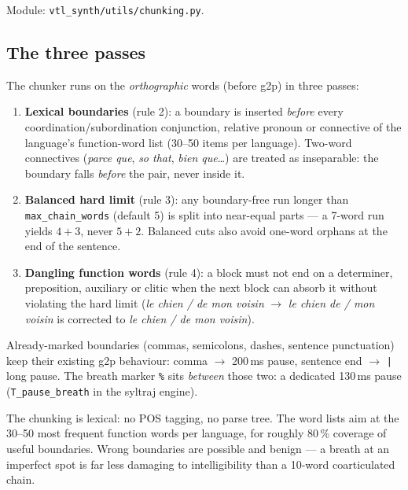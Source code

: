 \documentclass[11pt,a4paper]{article}
\newcommand{\ks}[1]{\texttt{#1}}
\begin{document}
Module: \texttt{vtl\_synth/utils/chunking.py}.

\subsection{The three passes}

The chunker runs on the \emph{orthographic} words (before g2p) in
three passes:

\begin{enumerate}[itemsep=2pt]
\item \textbf{Lexical boundaries} (rule 2): a boundary is inserted
  \emph{before} every coordination/subordination conjunction,
  relative pronoun or connective of the language's function-word
  list (30--50 items per language). Two-word connectives
  (\emph{parce que}, \emph{so that}, \emph{bien que}\ldots) are
  treated as inseparable: the boundary falls \emph{before} the
  pair, never inside it.
\item \textbf{Balanced hard limit} (rule 3): any boundary-free run
  longer than \texttt{max\_chain\_words} (default 5) is split into
  near-equal parts --- a 7-word run yields $4+3$, never $5+2$.
  Balanced cuts also avoid one-word orphans at the end of the
  sentence.
\item \textbf{Dangling function words} (rule 4): a block must not
  end on a determiner, preposition, auxiliary or clitic when the
  next block can absorb it without violating the hard limit
  (\emph{le chien / de mon voisin} $\rightarrow$ \emph{le chien de
  / mon voisin} is corrected to \emph{le chien / de mon voisin}).
\end{enumerate}

Already-marked boundaries (commas, semicolons, dashes, sentence
punctuation) keep their existing g2p behaviour: comma $\rightarrow$
200\,ms pause, sentence end $\rightarrow$ \ks{|} long pause. The
breath marker \ks{\%} sits \emph{between} those two: a dedicated
130\,ms pause (\texttt{T\_pause\_breath} in the syltraj engine).

\begin{callout}
The chunking is lexical: no POS tagging, no parse tree. The word
lists aim at the 30--50 most frequent function words per language,
for roughly 80\,\% coverage of useful boundaries. Wrong boundaries
are possible and benign --- a breath at an imperfect spot is far
less damaging to intelligibility than a 10-word coarticulated
chain.
\end{callout}
\end{document}
